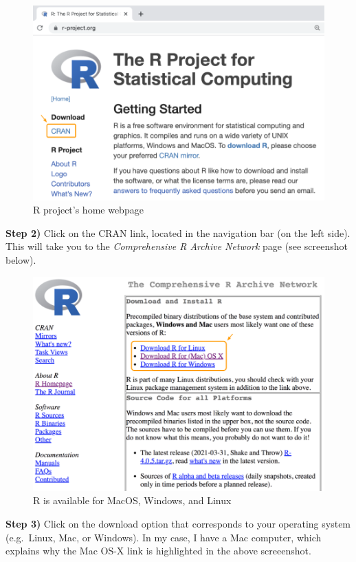 \documentclass[
]{book}
\begin{document}
\begin{figure}

{\centering \includegraphics[width=0.7\linewidth]{images/install/r-project} 

}

\caption{R project's home webpage}\label{fig:unnamed-chunk-5}
\end{figure}

\textbf{Step 2)} Click on the CRAN link, located in the navigation bar (on the left
side). This will take you to the \emph{Comprehensive R Archive Network} page (see
screenshot below).

\begin{figure}

{\centering \includegraphics[width=0.7\linewidth]{images/install/cran-download} 

}

\caption{R is available for MacOS, Windows, and Linux}\label{fig:unnamed-chunk-6}
\end{figure}

\textbf{Step 3)} Click on the download option that corresponds to your operating
system (e.g.~Linux, Mac, or Windows). In my case, I have a Mac computer, which
explains why the Mac OS-X link is highlighted in the above screeenshot.
\end{document}
